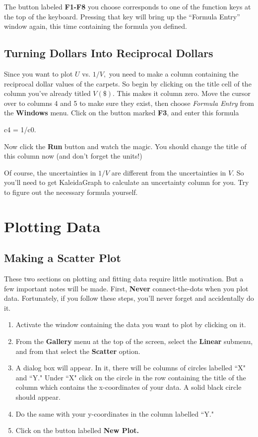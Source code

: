 \documentclass[12pt]{article}
\begin{document}
The button labeled {\bf F1-F8} you choose corresponds to one of the function keys at the top
of the keyboard. Pressing that key will bring up the ``Formula Entry''
window again, this time containing the formula you defined.

\subsection{Turning Dollars Into Reciprocal Dollars}
 
Since you want to plot $U$ vs. $1/V,$ you need to make a column containing the
reciprocal dollar values of the carpets. So begin by clicking on the title cell of the
column you've already titled $V (\$).$ This makes it column zero. Move the cursor over to
columns 4 and 5 to make sure they exist, then choose {\it Formula Entry}
from the {\bf Windows} menu. Click on the button marked {\bf F3}, and enter this formula
\begin{center}
c4 = 1/c0.
\end{center}
Now click the {\bf Run} button and watch the magic. You should change the title of this
column now (and don't forget the units!)

Of course, the uncertainties in $1/V$ are different from the uncertainties in $V.$ So
you'll need to get KaleidaGraph to calculate an uncertainty column for you. Try to
figure out the necessary formula yourself.

\section{Plotting Data}

\subsection{Making a Scatter Plot}
These two sections on plotting and fitting data require little motivation. But a few
important notes will be made. First, {\bf Never} connect-the-dots when you plot data.
Fortunately, if you follow these steps, you'll never forget and accidentally do it.

\noindent
\begin{enumerate}
\item Activate the window containing the data you want to plot by clicking on it.
\item From the {\bf Gallery} menu at the top of the screen, select the {\bf Linear}
submenu, and from that select the {\bf Scatter} option.
\item A dialog box will appear. In it, there will be columns of circles labelled ``X"
and ``Y." Under ``X" click on the circle in the row containing the title of the column
which contains the x-coordinates of your data. A solid black circle should appear.
\item Do the same with your y-coordinates in the column labelled ``Y."
\item Click on the button labelled {\bf New Plot.}
\end{enumerate}
\indent
\end{document}
